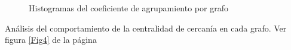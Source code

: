 \documentclass{article}
\begin{document}
\begin{figure}[htbp]
\caption{Histogramas del coeficiente de agrupamiento por grafo}
\label{Fig3} 
\end{figure}

Análisis del comportamiento de la centralidad de cercanía en cada grafo. Ver figura \ref{Fig4} de la página \pageref{Fig4} 
\end{document}
